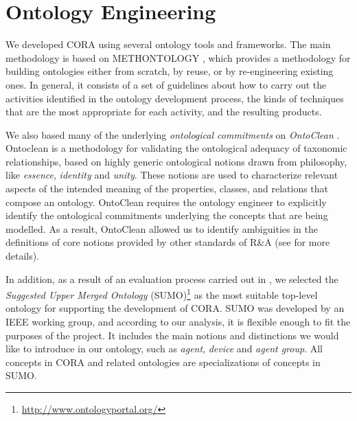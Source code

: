 \documentclass[preprint,12pt]{elsarticle}
\begin{document}




\section{Ontology Engineering}


We developed CORA using several ontology tools and frameworks. The main methodology is based on METHONTOLOGY \cite{Fernandez97}, which provides a methodology for building ontologies either from scratch, by reuse, or by re-engineering existing ones. In general, it consists of a set of guidelines about how to carry out the activities identified in the ontology development process, the kinds of techniques that are the most appropriate for each activity, and the resulting products. 

We also based many of the underlying \textit{ontological commitments} on \textit{OntoClean} \cite{Guarino2009}. Ontoclean is a methodology for validating the ontological adequacy of taxonomic relationships, based on highly generic ontological notions drawn from philosophy, like \textit{essence}, \textit{identity} and \textit{unity}. These notions are used to characterize relevant aspects of the intended meaning of the properties, classes, and relations that compose an ontology. OntoClean requires the ontology engineer to explicitly identify the ontological commitments underlying the concepts that are being modelled. As a result, OntoClean allowed us to identify ambiguities in the definitions of core notions provided by other standards of R\&A (see \cite{prestes2013towards} for more details).

In addition, as a result of an evaluation process carried out in \cite{prestes2013towards}, we selected the \emph{Suggested Upper Merged Ontology} (SUMO)\footnote{\url{http://www.ontologyportal.org/}} \cite{SUMO} as the most suitable top-level ontology for supporting the development of CORA. SUMO was developed by an IEEE working group, and according to our analysis, it is flexible enough to fit the purposes of the project. It includes the main notions and distinctions we would like to introduce in our ontology, such as \textit{agent}, \textit{device} and \textit{agent group}. All concepts in CORA and related ontologies are specializations of concepts in SUMO. 
\end{document}
